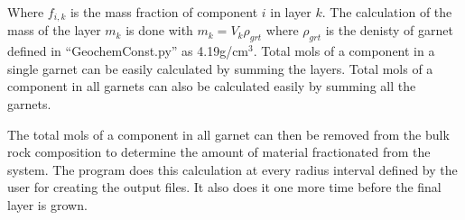 \documentclass[12pt]{article}
\begin{document}
Where $f_{i,k}$ is the mass fraction of component $i$ in layer $k$. The calculation of the mass of the layer $m_k$ is done with $m_k = V_k\rho_{grt}$ where $\rho_{grt}$ is the denisty of garnet defined in ``GeochemConst.py'' as 4.19g/cm$^3$. Total mols of a component in a single garnet can be easily calculated by summing the layers. Total mols of a component in all garnets can also be calculated easily by summing all the garnets.

The total mols of a component in all garnet can then be removed from the bulk rock composition to determine the amount of material fractionated from the system. The program does this calculation at every radius interval defined by the user for creating the output files. It also does it one more time before the final layer is grown.
\end{document}
